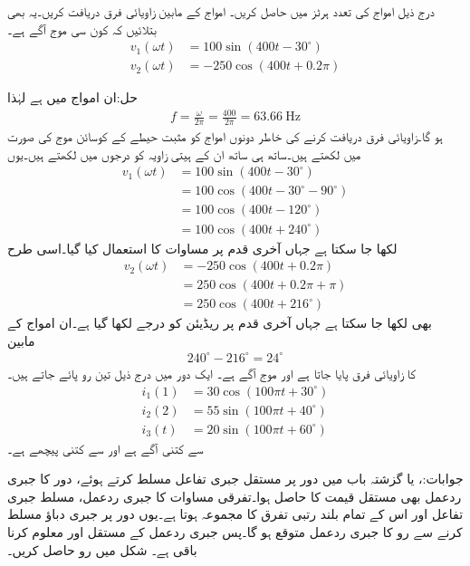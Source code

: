 درج ذیل امواج کی تعدد ہرٹز میں حاصل کریں۔ امواج کے مابین زاویائی فرق دریافت کریں۔یہ بھی بتلائیں کہ کون سی موج آگے ہے۔
\begin{align*}
v_1(\omega t)&=100\sin(400t -30^{\circ})\\
v_2(\omega t)&=-250\cos(400t+0.2\pi)
\end{align*}

حل:ان امواج میں  ہے لہٰذا
\begin{align*}
f=\frac{\omega}{2\pi}=\frac{400}{2\pi}=\SI{63.66}{\hertz}
\end{align*}
ہو گا۔زاویائی فرق دریافت کرنے کی خاطر دونوں امواج کو مثبت حیطے کے کوسائن موج کی صورت میں لکھتے ہیں۔ساتھ ہی ساتھ ان کے ہیتی زاویہ کو درجوں میں لکھتے ہیں۔یوں
\begin{align*}
v_1(\omega t)&=100\sin(400t -30^{\circ})\\
&=100\cos(400t-30^{\circ}-90^{\circ})\\
&=100\cos(400t-120^{\circ})\\
&=100\cos(400t+240^{\circ})
\end{align*}
لکھا جا سکتا ہے جہاں آخری قدم پر مساوات  کا استعمال کیا گیا۔اسی طرح
\begin{align*}
v_2(\omega t)&=-250\cos(400t+0.2\pi)\\
&=250\cos(400t+0.2\pi+\pi)\\
&=250\cos(400t+216^{\circ})
\end{align*}
بھی لکھا جا سکتا ہے جہاں آخری قدم پر  ریڈیئن کو  درجے لکھا گیا ہے۔ان امواج کے مابین
\begin{align*}
240^{\circ}-216^{\circ}=24^{\circ}
\end{align*}
کا زاویائی فرق پایا جاتا ہے اور موج  آگے ہے۔
ایک دور میں درج ذیل تین رو پائے جاتے ہیں۔
\begin{align*}
i_1(1)&=30\cos(100\pi t+30^{\circ})\\
i_2(2)&=55\sin(100\pi t +40^{\circ})\\
i_3(t)&=20\sin(100 \pi t+60^{\circ})
\end{align*}
 سے  کتنی آگے ہے اور  سے  کتنی پیچھے ہے۔

جوابات:،  یا  
گزشتہ باب میں دور پر مستقل جبری تفاعل مسلط  کرتے ہوئے، دور کا جبری ردعمل بھی مستقل قیمت کا حاصل ہوا۔تفرقی مساوات کا جبری ردعمل، مسلط جبری تفاعل اور اس کے تمام بلند رتبی تفرق کا مجموعہ ہوتا ہے۔یوں  دور پر جبری دباؤ  مسلط کرنے سے رو کا جبری ردعمل  متوقع ہو گا۔پس جبری ردعمل کے مستقل  اور  معلوم کرنا باقی ہے۔
شکل  میں رو  حاصل کریں۔

